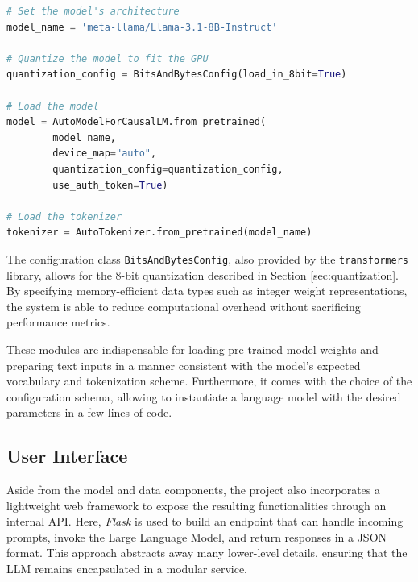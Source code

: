 \begin{center}
\begin{minipage}{0.7\textwidth}
\begin{lstlisting}[language=Python, frame=single, caption=Importing LLaMa through Transformers Library]
# Set the model's architecture
model_name = 'meta-llama/Llama-3.1-8B-Instruct'

# Quantize the model to fit the GPU
quantization_config = BitsAndBytesConfig(load_in_8bit=True)
    
# Load the model
model = AutoModelForCausalLM.from_pretrained(
        model_name,
        device_map="auto",
        quantization_config=quantization_config,
        use_auth_token=True)

# Load the tokenizer
tokenizer = AutoTokenizer.from_pretrained(model_name)
\end{lstlisting}
\label{lst:transformers-script}
\end{minipage}
\end{center}

The configuration class \verb|BitsAndBytesConfig|, also provided by the \verb|transformers| library, allows for the 8-bit quantization described in Section \ref{sec:quantization}. By specifying memory-efficient data types such as integer weight representations, the system is able to reduce computational overhead without sacrificing performance metrics.

These modules are indispensable for loading pre-trained model weights and preparing text inputs in a manner consistent with the model’s expected vocabulary and tokenization scheme. Furthermore, it comes with the choice of the configuration schema, allowing to instantiate a language model with the desired parameters in a few lines of code.


\subsection{User Interface}
\label{sec:user-interface}

Aside from the model and data components, the project also incorporates a lightweight web framework to expose the resulting functionalities through an internal API. Here, \textit{Flask} is used to build an endpoint that can handle incoming prompts, invoke the Large Language Model, and return responses in a JSON format. This approach abstracts away many lower-level details, ensuring that the LLM remains encapsulated in a modular service.

